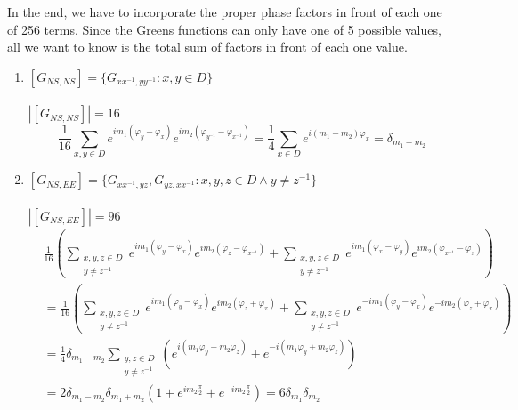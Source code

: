 \documentclass{article}
\newcommand{\abs}[1]{\left\vert #1 \right\vert}
\begin{document}
In the end, we have to incorporate the proper phase factors in front of each one of 256 terms. Since the Greens functions can only have one of 5 possible values, all we want to know is the total sum of factors in front of each one value.
\begin{enumerate}
    \item  $[G_{NS,NS}] = \{G_{xx^{-1},yy^{-1}} : x, y \in D\}$
    \\\\$\abs{[G_{NS,NS}]} = 16$
    \begin{equation}
    \frac{1}{16}\sum_{x, y \in D}
        e^{i m_1 (\varphi_{y} - \varphi_{x})}
        e^{i m_2 (\varphi_{y^{-1}} - \varphi_{x^{-1}})}
    = \frac{1}{4}\sum_{x \in D} e^{i (m_1 - m_2) \varphi_x}
    = \delta_{m_1 - m_2}
    \end{equation}
    
    \item  $[G_{NS,EE}] = \{G_{xx^{-1},yz}, G_{yz, xx^{-1}} : x, y, z \in D \land y \neq z^{-1}\}$
    \\\\$\abs{[G_{NS,EE}]} = 96$
    \begin{equation}
    \begin{split}
    &\frac{1}{16}\left(
    \sum_{\substack{
        x, y, z \in D \\ 
        y \neq z^{-1}
    }}
        e^{i m_1 (\varphi_{y} - \varphi_{x})}
        e^{i m_2 (\varphi_{z} - \varphi_{x^{-1}})}
    +
    \sum_{\substack{
        x, y, z \in D \\ 
        y \neq z^{-1}
    }}
        e^{i m_1 (\varphi_{x} - \varphi_{y})}
        e^{i m_2 (\varphi_{x^{-1}} - \varphi_{z})}
    \right) \\
    &=
    \frac{1}{16}\left(
    \sum_{\substack{
        x, y, z \in D \\ 
        y \neq z^{-1}
    }}
        e^{i m_1 (\varphi_{y} - \varphi_{x})}
        e^{i m_2 (\varphi_{z} + \varphi_{x})}
    +
    \sum_{\substack{
        x, y, z \in D \\ 
        y \neq z^{-1}
    }}
        e^{-i m_1 (\varphi_{y} - \varphi_{x})}
        e^{-i m_2 (\varphi_{z} + \varphi_{x})}
    \right) \\
    &=
    \frac{1}{4}\delta_{m_1 - m_2}
    \sum_{\substack{
        y, z \in D \\ 
        y \neq z^{-1}
    }} \left(
        e^{i (m_1 \varphi_{y} + m_2 \varphi_{z})} +
        e^{- i (m_1 \varphi_{y} + m_2 \varphi_{z})}
    \right) \\
    &=
    2\delta_{m_1 - m_2}\delta_{m_1 + m_2}\left(
        1 + e^{i m_2 \frac{\pi}{2}} + e^{-i m_2 \frac{\pi}{2}}
    \right) = 6 \delta_{m_1} \delta_{m_2}
    \end{split}
    \end{equation}
    

\end{enumerate}
\end{document}
